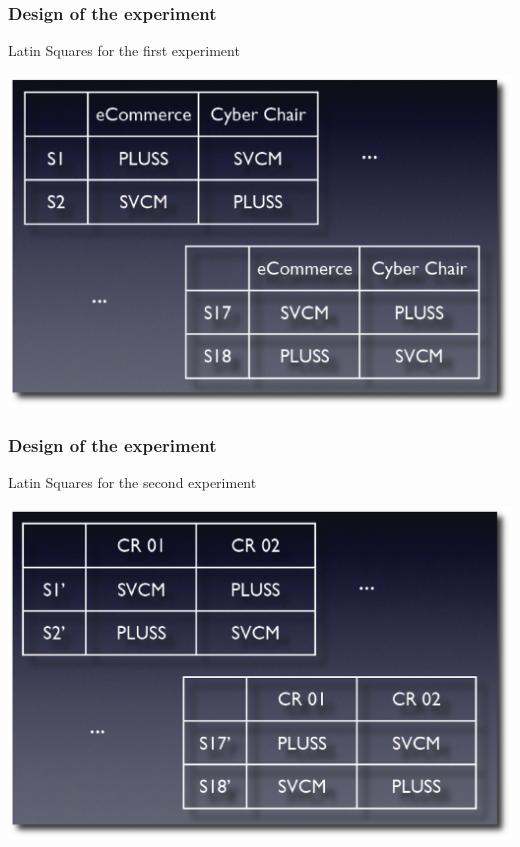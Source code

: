 \documentclass{beamer}
\begin{document}
\begin{frame}
\frametitle{Design of the experiment}
Latin Squares for the first experiment
 \begin{center}
 \includegraphics[scale=0.25]{images/lsquare01.eps}
 \end{center}
\end{frame}

\begin{frame}
\frametitle{Design of the experiment}
Latin Squares for the second experiment
\begin{center}
 \includegraphics[scale=0.25]{images/lsquare02.eps}
\end{center}
\end{frame}
\end{document}
